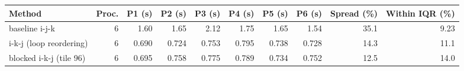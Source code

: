 \begin{tabular}{lrrrrrrrrr}
\toprule
Method & Proc. & P1 (s) & P2 (s) & P3 (s) & P4 (s) & P5 (s) & P6 (s) & Spread (\%) & Within IQR (\%) \\
\midrule
baseline i-j-k & 6 & 1.60 & 1.65 & 2.12 & 1.75 & 1.65 & 1.54 & 35.1 & 9.23 \\
i-k-j (loop reordering) & 6 & 0.690 & 0.724 & 0.753 & 0.795 & 0.738 & 0.728 & 14.3 & 11.1 \\
blocked i-k-j (tile 96) & 6 & 0.695 & 0.758 & 0.775 & 0.789 & 0.734 & 0.752 & 12.5 & 14.0 \\
\bottomrule
\end{tabular}

